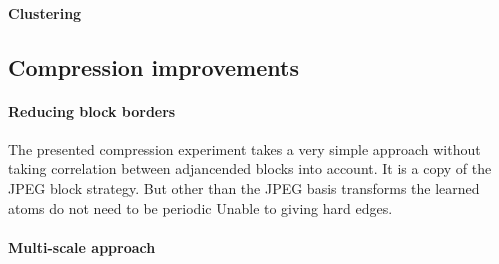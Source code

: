 \paragraph{Clustering}

\subsection{Compression improvements}
\paragraph{Reducing block borders} The presented compression experiment
takes a very simple approach without taking correlation between adjancended
blocks into account. It is a copy of the JPEG block strategy. But other than
the JPEG basis transforms the learned atoms do not need to be periodic
Unable to giving
hard edges. 


\paragraph{Multi-scale approach}

